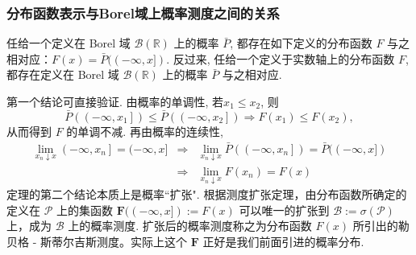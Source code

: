 \begin{frame}
	\frametitle{分布函数表示与Borel域上概率测度之间的关系}
\begin{thm}
任给一个定义在 Borel 域 \( \mathcal{B}(\mathbb{R}) \) 上的概率 \( \bar{P} \), 都存在如下定义的分布函数 \( F \) 与之相对应：$	F(x)=\bar{P}((-\infty, x])$. 反过来, 任给一个定义于实数轴上的分布函数 $F$, 都存在定义在 Borel 域 $\mathcal{B}(\mathbb{R})$ 上的概率 $\bar{P}$ 与之相对应.
\end{thm}

\pause

\zheng
第一个结论可直接验证. 由概率的单调性, 若$x_{1} \leqslant x_{2}$, 则
{\small \[\bar{P}\left(\left(-\infty, x_{1}\right]\right) \leqslant \bar{P}\left(\left(-\infty, x_{2}\right]\right)\Rightarrow F\left(x_{1}\right) \leqslant F\left(x_{2}\right),\]}从而得到 $F$ 的单调不减. \pause 再由概率的连续性,
{\small \begin{eqnarray*}
	\lim _{x_{n} \downarrow x}\left(-\infty, x_{n}\right]=(-\infty, x]
	&\Rightarrow&  \lim _{x_{n} \downarrow x} \bar{P}\left(\left(-\infty, x_{n}\right]\right)=\bar{P}((-\infty, x]) \\
	&\Rightarrow&  \lim _{x_{n} \downarrow x} F\left(x_{n}\right)=F(x)
\end{eqnarray*}}%
\pause
定理的第二个结论本质上是概率``扩张". 根据测度扩张定理，由分布函数所确定的定义在 $\mathcal{P}$ 上的集函数 $\mathbf{F}((-\infty, x]):=F (x)$ 可以唯一的扩张到 $\mathcal{B}:=\sigma (\mathcal{P})$ 上，成为 $\mathcal{B}$ 上的概率测度. 扩张后的概率测度称之为分布函数 $F (x)$ 所引出的勒贝格 - 斯蒂尔吉斯测度。实际上这个 $\mathbf{F}$ 正好是我们前面引进的概率分布.

\end{frame}


